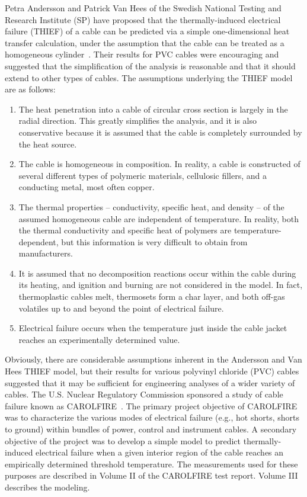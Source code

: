 \documentclass[11pt]{book}
\begin{document}
Petra Andersson and Patrick Van Hees of the Swedish National Testing and Research Institute (SP) have proposed that the thermally-induced electrical failure (THIEF) of a cable can be predicted via a simple one-dimensional heat transfer calculation, under the assumption that the cable can be treated as a homogeneous cylinder~\cite{Andersson:2005}. Their results for PVC cables were encouraging and suggested that the simplification of the analysis is reasonable and that it should extend to other types of cables. The assumptions underlying the THIEF model are as follows:
\begin{enumerate}
\item The heat penetration into a cable of circular cross section is largely in the radial direction. This greatly simplifies the analysis, and it is also conservative because it is assumed that the cable is completely surrounded by the heat source.
\item The cable is homogeneous in composition. In reality, a cable is constructed of several different types of polymeric materials, cellulosic fillers, and a conducting metal, most often copper.
\item The thermal properties -- conductivity, specific heat, and density -- of the assumed homogeneous cable are independent of temperature. In reality, both the thermal conductivity and specific heat of polymers are temperature-dependent, but this information is very difficult to obtain from manufacturers.
\item It is assumed that no decomposition reactions occur within the cable during its heating, and ignition and burning are not considered in the model. In fact, thermoplastic cables melt, thermosets form a char layer, and both off-gas volatiles up to and beyond the point of electrical failure.
\item Electrical failure occurs when the temperature just inside the cable jacket reaches an experimentally determined value.
\end{enumerate}
Obviously, there are considerable assumptions inherent in the Andersson and Van Hees THIEF model, but their results for various polyvinyl chloride (PVC) cables suggested that it may be sufficient for engineering analyses of a wider variety of cables. The U.S. Nuclear Regulatory Commission sponsored a study of cable failure known as CAROLFIRE~\cite{CAROLFIRE}. The primary project objective of CAROLFIRE was to characterize the various modes of electrical failure (e.g., hot shorts, shorts to ground) within bundles of power, control and instrument cables. A secondary objective of the project was to develop a simple model to predict thermally-induced electrical failure when a given interior region of the cable reaches an empirically determined threshold temperature. The measurements used for these purposes are described in Volume II of the CAROLFIRE test report. Volume III describes the modeling.
\end{document}

